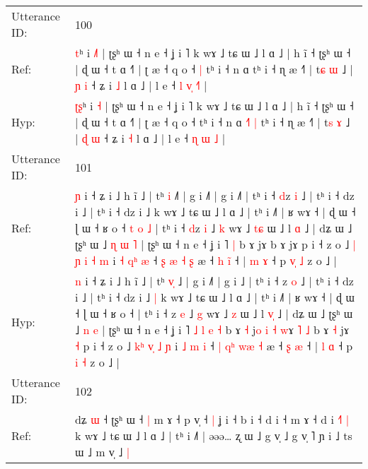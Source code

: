 \documentclass[10pt]{article}
\DeclareRobustCommand{\hl}[1]{{\textcolor{red}{#1}}}
\begin{document}
\begin{longtable}{ll}
\midrule
Utterance ID: & 100 \\
Ref: & \hl{}\hl{t}ʰ i \hl{˩}\hl{˥} | ʈʂʰ ɯ ˧ n e ˧ ʝ i ˥ k wɤ ˩ tɕ ɯ ˩ l ɑ ˩ | h ĩ ˧ ʈʂʰ ɯ ˧ | ɖ ɯ ˧ t ɑ ˧˥ | ʈ æ ˧ q o ˧\hl{ }\hl{|} tʰ i ˧ n ɑ\hl{}\hl{}\hl{}\hl{}\hl{} tʰ i ˧ ɳ æ ˧˥ | t\hl{ɕ} \hl{ɯ} ˩ | \hl{ɲ} \hl{i} ˧ ʑ i \hl{˩} l ɑ ˩ | l e ˧ \hl{l} \hl{v}\hl{̩} \hl{˧}\hl{˥} |
 \\
Hyp: & \hl{ʈ}\hl{ʂ}ʰ i \hl{}\hl{˧} | ʈʂʰ ɯ ˧ n e ˧ ʝ i ˥ k wɤ ˩ tɕ ɯ ˩ l ɑ ˩ | h ĩ ˧ ʈʂʰ ɯ ˧ | ɖ ɯ ˧ t ɑ ˧˥ | ʈ æ ˧ q o ˧\hl{}\hl{} tʰ i ˧ n ɑ\hl{ }\hl{˧}\hl{˥}\hl{ }\hl{|} tʰ i ˧ ɳ æ ˧˥ | t\hl{s} \hl{ɤ} ˩ | \hl{ɖ} \hl{ɯ} ˧ ʑ i \hl{˧} l ɑ ˩ | l e ˧ \hl{ɳ} \hl{}\hl{ɯ} \hl{}\hl{˩} |
 \\
\midrule
Utterance ID: & 101 \\
Ref: & \hl{ɲ} i ˧ ʑ i ˩ h ĩ ˩ | tʰ \hl{}\hl{i} ˩\hl{˥} | g i ˩˥ | g i ˩\hl{˥} | tʰ i ˧ \hl{d}z \hl{i} ˩ | tʰ i ˧ dz i ˩ | tʰ i ˧ dz i ˩\hl{}\hl{} k wɤ ˩ tɕ ɯ ˩ l ɑ ˩ | tʰ i ˩˥ | ʁ wɤ ˧ | ɖ ɯ ˧ ɭ ɯ ˧ ʁ o ˧\hl{ }\hl{t}\hl{ }\hl{o}\hl{ }\hl{˩} | tʰ i ˧ \hl{d}z \hl{i} ˩ \hl{k} wɤ ˩ \hl{t}\hl{ɕ} ɯ ˩ l \hl{}\hl{ɑ} ˩ | dʑ ɯ ˩ ʈʂʰ ɯ ˩\hl{ }\hl{ɳ} \hl{ɯ} \hl{˥} | ʈʂʰ ɯ ˧ n e ˧ ʝ i ˥\hl{}\hl{}\hl{}\hl{}\hl{}\hl{} \hl{|} b ɤ\hl{}\hl{} j\hl{}\hl{}\hl{}\hl{}\hl{}\hl{}\hl{}ɤ\hl{}\hl{}\hl{}\hl{} b ɤ\hl{}\hl{} jɤ\hl{}\hl{} p i ˧ z o ˩ \hl{|}\hl{ }\hl{ɲ}\hl{ }\hl{i} \hl{˧} \hl{m} i \hl{˧} \hl{q}\hl{ʰ} \hl{æ} ˧ \hl{ʂ} \hl{}\hl{æ} \hl{}\hl{˧} \hl{ʂ} æ ˧ \hl{h} \hl{i}\hl{̃} ˧ | \hl{m} \hl{ɤ} ˧ p \hl{v}\hl{̩} \hl{˩} z o ˩ |
 \\
Hyp: & \hl{n} i ˧ ʑ i ˩ h ĩ ˩ | tʰ \hl{v}\hl{̩} ˩\hl{} | g i ˩˥ | g i ˩\hl{} | tʰ i ˧ \hl{}z \hl{o} ˩ | tʰ i ˧ dz i ˩ | tʰ i ˧ dz i ˩\hl{ }\hl{|} k wɤ ˩ tɕ ɯ ˩ l ɑ ˩ | tʰ i ˩˥ | ʁ wɤ ˧ | ɖ ɯ ˧ ɭ ɯ ˧ ʁ o ˧\hl{}\hl{}\hl{}\hl{}\hl{}\hl{} | tʰ i ˧ \hl{}z \hl{e} ˩ \hl{g} wɤ ˩ \hl{}\hl{z} ɯ ˩ l \hl{v}\hl{̩} ˩ | dʑ ɯ ˩ ʈʂʰ ɯ ˩\hl{}\hl{} \hl{n} \hl{e} | ʈʂʰ ɯ ˧ n e ˧ ʝ i ˥\hl{ }\hl{˩}\hl{ }\hl{l}\hl{ }\hl{e} \hl{˧} b ɤ\hl{ }\hl{˧} j\hl{o}\hl{ }\hl{i}\hl{ }\hl{˧}\hl{ }\hl{w}ɤ\hl{ }\hl{˥}\hl{ }\hl{˩} b ɤ\hl{ }\hl{˧} jɤ\hl{ }\hl{˧} p i ˧ z o ˩ \hl{k}\hl{ʰ}\hl{ }\hl{v}\hl{̩} \hl{˩} \hl{ɲ} i \hl{˩} \hl{}\hl{m} \hl{i} ˧ \hl{|} \hl{q}\hl{ʰ} \hl{w}\hl{æ} \hl{˧} æ ˧ \hl{ʂ} \hl{}\hl{æ} ˧ | \hl{l} \hl{ɑ} ˧ p \hl{}\hl{i} \hl{˧} z o ˩ |
 \\
\midrule
Utterance ID: & 102 \\
Ref: & dʑ \hl{ɯ} ˧ ʈʂʰ ɯ ˧\hl{ }\hl{|} m ɤ ˧ p v̩ ˧\hl{ }\hl{|} ʝ i ˧ b i ˧ d i ˧ m ɤ ˧ d i \hl{˧}˥\hl{ }\hl{|} k wɤ ˩ tɕ ɯ ˩ l ɑ ˩ | tʰ i ˩˥ | əəə… ʐ ɯ ˩ g v̩ ˩ g v̩ ˥ ɲ\hl{}\hl{}\hl{}\hl{}\hl{}\hl{} i ˩ ts ɯ ˩\hl{}\hl{} m v̩ ˩\hl{ }\hl{|}

\end{longtable}
\end{document}
